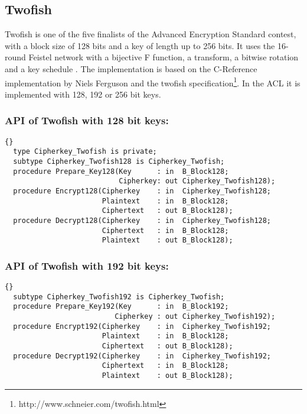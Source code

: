 \subsection{Twofish}
Twofish is one of the five finalists of the Advanced Encryption Standard contest, with a block size of 128 bits and a key of length up to 256 bits. It uses the 16-round Feistel network with a bijective F function, a transform, a bitwise rotation and a key schedule \cite{Twofish}. The implementation is based on the C-Reference implementation by Niels Ferguson and the twofish specification\footnote{http://www.schneier.com/twofish.html}. In the ACL it is implemented with 128, 192 or 256 bit keys.
\subsubsection*{API of Twofish with 128 bit keys:}
\begin{lstlisting}{}
  type Cipherkey_Twofish is private;
  subtype Cipherkey_Twofish128 is Cipherkey_Twofish;
  procedure Prepare_Key128(Key      : in  B_Block128;
                           Cipherkey: out Cipherkey_Twofish128);
  procedure Encrypt128(Cipherkey    : in  Cipherkey_Twofish128;
                       Plaintext    : in  B_Block128;
                       Ciphertext   : out B_Block128);
  procedure Decrypt128(Cipherkey    : in  Cipherkey_Twofish128;
                       Ciphertext   : in  B_Block128;
                       Plaintext    : out B_Block128);
\end{lstlisting}
\subsubsection*{API of Twofish with 192 bit keys:}
\begin{lstlisting}{}
  subtype Cipherkey_Twofish192 is Cipherkey_Twofish;
  procedure Prepare_Key192(Key      : in  B_Block192;
                          Cipherkey : out Cipherkey_Twofish192);
  procedure Encrypt192(Cipherkey    : in  Cipherkey_Twofish192;
                       Plaintext    : in  B_Block128;
                       Ciphertext   : out B_Block128);
  procedure Decrypt192(Cipherkey    : in  Cipherkey_Twofish192;
                       Ciphertext   : in  B_Block128;
                       Plaintext    : out B_Block128);
\end{lstlisting}
